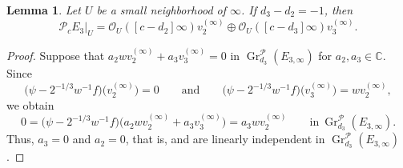 \documentclass[10pt,a4paper]{amsart}
\numberwithin{equation}{section}
\newtheorem{Lemma}[Theorem]{Lemma}
\newcommand{\C}{\mathbb{C}}
\newcommand{\gr}{\operatorname{\mathrm{Gr}}}
\begin{document}
\begin{Lemma}%
 Let $U$ be a small neighborhood of $\infty$. If $d_3-d_2=-1$, then
 \begin{equation*}
 \mathcal{P}_{c}E_3|_{U} = \mathcal{O}_U([c-d_2]\infty)v^{(\infty)}_2 \oplus \mathcal{O}_U([c-d_3]\infty)v^{(\infty)}_3.
 \end{equation*}
\end{Lemma}
\begin{proof}
 Suppose that $a_2wv^{(\infty)}_2+a_3v^{(\infty)}_3=0$ in $\gr^{\mathcal{P}}_{d_3}(E_{3,\infty})$ for $a_2,a_3\in\C$.
Since
 \[
 \big(\psi-2^{-1/3}w^{-1}f\big)\big(v^{(\infty)}_2\big)=0 \qquad \text{and} \qquad \big(\psi-2^{-1/3}w^{-1}f\big)\big(v^{(\infty)}_3\big)=wv^{(\infty)}_2,
 \]
 we obtain
 \begin{equation*}
 0 = \big(\psi-2^{-1/3}w^{-1}f\big)\big(a_2wv^{(\infty)}_2+a_3v^{(\infty)}_3\big) = a_3wv^{(\infty)}_2\qquad \text{in}\ \gr^{\mathcal{P}}_{d_3}(E_{3,\infty}).
 \end{equation*}
 Thus, $a_3=0$ and $a_2=0$, that is,  and  are linearly independent in $\gr^{\mathcal{P}}_{d_3}(E_{3,\infty})$.
\end{proof}
\end{document}
